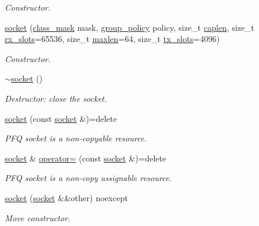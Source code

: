 \begin{DoxyCompactItemize}
\begin{DoxyCompactList}\small\item\em Constructor. \end{DoxyCompactList}\item 
\hyperlink{classpfq_1_1socket_a9aa326dac10a561a5bffadeffb928179}{socket} (\hyperlink{namespacepfq_a96af1f5ed530eff563eb917516758fbb}{class\+\_\+mask} mask, \hyperlink{namespacepfq_ac41249c8510558905b01fa4d866a38d7}{group\+\_\+policy} policy, size\+\_\+t \hyperlink{classpfq_1_1socket_ab68dbba5ef01041b9c96758c4a9f0a6c}{caplen}, size\+\_\+t \hyperlink{classpfq_1_1socket_a5cf700fc12d67b91df3d669ac4aa737a}{rx\+\_\+slots}=65536, size\+\_\+t \hyperlink{classpfq_1_1socket_a863da5015c00d6a49f1515b703c24230}{maxlen}=64, size\+\_\+t \hyperlink{classpfq_1_1socket_a019d15a072c043d6a1333ca0c836da4c}{tx\+\_\+slots}=4096)
\begin{DoxyCompactList}\small\item\em Constructor. \end{DoxyCompactList}\item 
\hyperlink{classpfq_1_1socket_a08fbdcc1736de36d205282ce20ffbaa3}{$\sim$socket} ()
\begin{DoxyCompactList}\small\item\em Destructor\+: close the socket. \end{DoxyCompactList}\item 
\hyperlink{classpfq_1_1socket_a517b6fdd622cdb2a64f2960176296f8d}{socket} (const \hyperlink{classpfq_1_1socket}{socket} \&)=delete
\begin{DoxyCompactList}\small\item\em P\+F\+Q socket is a non-\/copyable resource. \end{DoxyCompactList}\item 
\hyperlink{classpfq_1_1socket}{socket} \& \hyperlink{classpfq_1_1socket_a3cfd9674358a2ffd8b37e76d73b8a654}{operator=} (const \hyperlink{classpfq_1_1socket}{socket} \&)=delete
\begin{DoxyCompactList}\small\item\em P\+F\+Q socket is a non-\/copy assignable resource. \end{DoxyCompactList}\item 
\hyperlink{classpfq_1_1socket_a1a60820551f1601beb54649d9ae48fa2}{socket} (\hyperlink{classpfq_1_1socket}{socket} \&\&other) noexcept
\begin{DoxyCompactList}\small\item\em Move constructor. \end{DoxyCompactList}\item 

\end{DoxyCompactItemize}
